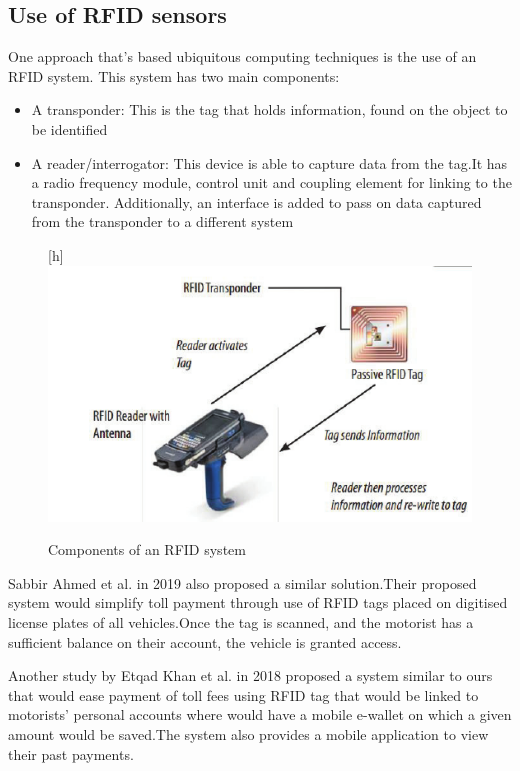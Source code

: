 \subsection{Use of RFID sensors}
One approach that's based ubiquitous computing techniques is the use of an RFID system. This system has two main components:
\begin{itemize}
    \item A transponder: This is the tag that holds information, found on the object to be identified
    \item A reader/interrogator: This device is able to capture data from the tag.It has a radio frequency module,  control unit and coupling element for linking to the transponder. Additionally, an interface is added to pass on data captured from the transponder to a different system
\end{itemize}
\begin{figure}
    \begin{center}[h]
        \includegraphics[scale = 0.3]{images/rfid-pic}
        \caption{Components of an RFID system}
    \end{center}
\end{figure}
Sabbir Ahmed et al. in 2019 also proposed a similar solution.Their proposed system would simplify toll payment through use of RFID tags placed on digitised license plates of all vehicles.Once the tag is scanned, and the motorist has a sufficient balance on their account, the vehicle is granted access\cite{ahmed_automated_2019}.


Another study by Etqad Khan et al. in 2018 proposed a system similar to ours that would ease payment of toll fees using RFID tag that would be linked to motorists' personal accounts where would have a mobile e-wallet on which a given amount would be saved.The system also provides a mobile application to view their past payments\cite{khan_automated_2018}.

